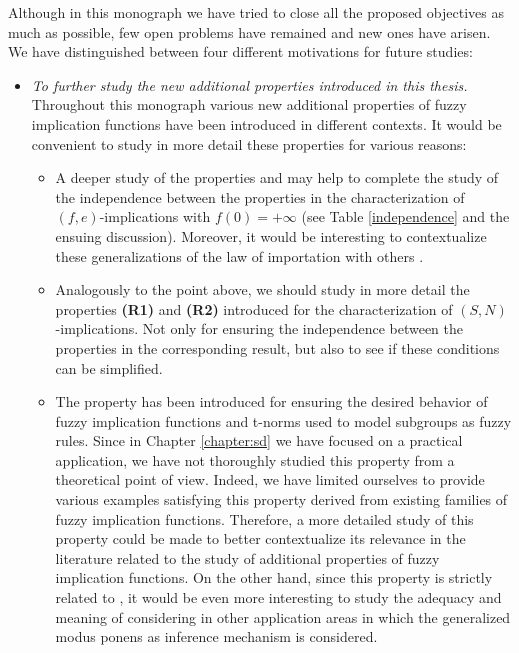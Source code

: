 Although in this monograph we have tried to close all the proposed objectives as much as possible, few open problems have remained and new ones have arisen. We have distinguished between four different motivations for future studies:
\begin{itemize}

\item \textit{To further study the new additional properties introduced in this thesis.}  Throughout this monograph various new additional properties of fuzzy implication functions have been introduced in different contexts. It would be convenient to study in more detail these properties for various reasons:
\begin{itemize}
	\item A deeper study of the properties \LIex and \LIey may help to complete the study of the independence between the properties in the characterization of $(f,e)$-implications with $f(0)=+\infty$ (see Table \ref{independence} and the ensuing discussion). Moreover, it would be interesting to contextualize these generalizations of the law of importation with others \cite{Baczynski2020,Massanet2011B}.
	\item Analogously to the point above, we should study in more detail the properties {\bf (R1)} and {\bf (R2)} introduced for the characterization of $(S,N)$-implications. Not only for ensuring the independence between the properties in the corresponding result, but also to see if these conditions can be simplified. 
	\item The property \MTC has been introduced for ensuring the desired behavior of fuzzy implication functions and t-norms used to model subgroups as fuzzy rules. Since in Chapter \ref{chapter:sd} we have focused on a practical application, we have not thoroughly studied this property from a theoretical point of view. Indeed, we have limited ourselves to provide various examples satisfying this property derived from existing families of fuzzy implication functions. Therefore, a more detailed study of this property could be made to better contextualize its relevance in the literature related to the study of additional properties of fuzzy implication functions. On the other hand, since this property is strictly related to \TC, it would be even more interesting to study the adequacy and meaning of considering \MTC in other application areas in which the generalized modus ponens as inference mechanism is considered.
\end{itemize}


\end{itemize}
